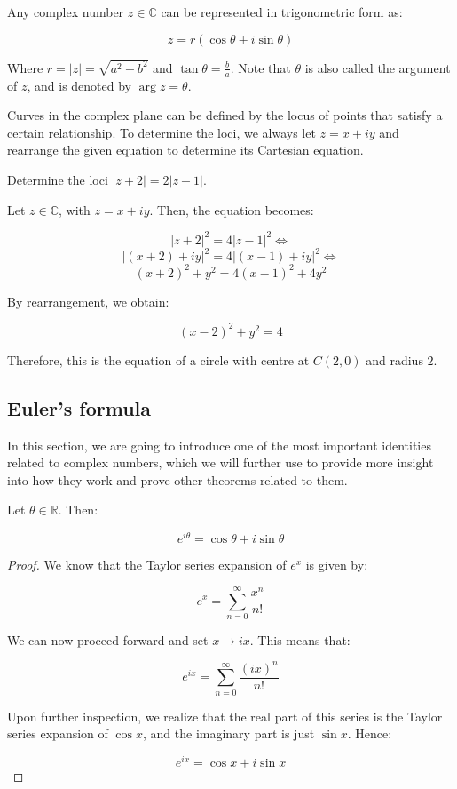 \documentclass[12pt]{article}
\begin{document}
\begin{proposition}
    Any complex number $z \in \mathbb{C}$ can be represented in trigonometric form as:

    \[ z = r(\cos{\theta} + i\sin{\theta}) \]

    Where $r = |z| = \sqrt{a^2 + b^2}$ and $\tan{\theta} = \frac{b}{a}$. Note that $\theta$ is also called the argument of $z$, and is denoted by $\arg{z} = \theta$.
\end{proposition}

Curves in the complex plane can be defined by the locus of points that satisfy a certain relationship. To determine the loci, we always let $z = x + iy$ and rearrange the given equation to determine its Cartesian equation.

\begin{example}
    Determine the loci $|z+2| = 2|z-1|$.

    Let $z \in \mathbb{C}$, with $z = x + iy$. Then, the equation becomes:
    
    \[ |z+2|^2 = 4|z-1|^2 \Leftrightarrow \]
    \[ |(x+2) + iy|^2 = 4|(x-1) + iy|^2 \Leftrightarrow \]
    \[ (x + 2)^2 + y^2 = 4(x - 1)^2 + 4y^2 \]

    By rearrangement, we obtain:

    \[ (x - 2)^2 + y^2 = 4 \]

    Therefore, this is the equation of a circle with centre at $C(2, 0)$ and radius $2$.
\end{example}

\newpage

\subsection{Euler's formula}

In this section, we are going to introduce one of the most important identities related to complex numbers, which we will further use to provide more insight into how they work and prove other theorems related to them.

\begin{theorem}
    Let $\theta \in \mathbb{R}$. Then:

    \[ e^{i\theta} = \cos{\theta} + i\sin{\theta} \]
\end{theorem}

\begin{proof}
    We know that the Taylor series expansion of $e^x$ is given by:

    \[ e^x = \sum_{n = 0}^\infty \frac{x^n}{n!} \]

    We can now proceed forward and set $x \to ix$. This means that:

    \[ e^{ix} = \sum_{n = 0}^\infty \frac{(ix)^n}{n!} \]

    Upon further inspection, we realize that the real part of this series is the Taylor series expansion of $\cos{x}$, and the imaginary part is just $\sin{x}$. Hence:

    \[ e^{ix} = \cos{x} + i\sin{x} \]
\end{proof}
\end{document}
